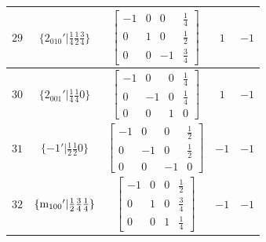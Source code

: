 \documentclass[fleqn,8pt]{jsarticle}
\begin{document}
\begin{longtable}{ccccc}
$ 29 $ & $ \{2{}_{010}{}'|\frac{1}{4} \frac{1}{2} \frac{3}{4}\} $ & $ \begin{bmatrix} -1 & 0 & 0 & \frac{1}{4} \\ 0 & 1 & 0 & \frac{1}{2} \\ 0 & 0 & -1 & \frac{3}{4} \end{bmatrix} $ & $ 1 $ & $ -1 $ \\ \hline
$ 30 $ & $ \{2{}_{001}{}'|\frac{1}{4} \frac{1}{4} 0\} $ & $ \begin{bmatrix} -1 & 0 & 0 & \frac{1}{4} \\ 0 & -1 & 0 & \frac{1}{4} \\ 0 & 0 & 1 & 0 \end{bmatrix} $ & $ 1 $ & $ -1 $ \\ \hline
$ 31 $ & $ \{-1{}'|\frac{1}{2} \frac{1}{2} 0\} $ & $ \begin{bmatrix} -1 & 0 & 0 & \frac{1}{2} \\ 0 & -1 & 0 & \frac{1}{2} \\ 0 & 0 & -1 & 0 \end{bmatrix} $ & $ -1 $ & $ -1 $ \\ \hline
$ 32 $ & $ \{{\rm m}_{100}{}'|\frac{1}{2} \frac{3}{4} \frac{1}{4}\} $ & $ \begin{bmatrix} -1 & 0 & 0 & \frac{1}{2} \\ 0 & 1 & 0 & \frac{3}{4} \\ 0 & 0 & 1 & \frac{1}{4} \end{bmatrix} $ & $ -1 $ & $ -1 $ \\
\end{longtable}
\end{document}
